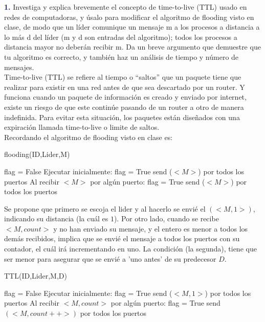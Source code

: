 \newpage
\textbf{\textcolor{MidnightBlue}{1.}}
Investiga y explica brevemente el concepto de time-to-live (TTL) usado en redes de
computadoras, y úsalo para modificar el algoritmo de flooding visto en clase, de modo que un
líder comunique un mensaje m a los procesos a distancia a lo más d del líder (m y d son entradas
del algoritmo); todos los procesos a distancia mayor no deberán recibir m. Da un breve argumento
que demuestre que tu algoritmo es correcto, y también haz un análisis de tiempo y número de
mensajes.\\

Time-to-live (TTL) se refiere al tiempo o “saltos” que un paquete tiene que
realizar para existir en una red antes de que sea descartado por un
router. Y funciona cuando un paquete de información es creado y enviado por internet,
existe un riesgo de que este continúe pasando de un router a otro de manera
indefinida. Para evitar esta situación, los paquetes están diseñados con
una expiración llamada time-to-live o limite de saltos.\\

Recordando el algoritmo de flooding visto en clase es:\\

\begin{algorithm}
\caption{flooding(ID,Lider,M)}\label{alg:cap}
\begin{algorithmic}[1]

\State flag = False
\State Ejecutar inicialmente:
        \State flag = True
        \State send ($<M>$) por todos los puertos
    \EndIf
\State Al recibir $<M>$ por algún puerto:
        \State flag = True
        \State send ($<M>$) por todos los puertos
    \EndIf
\end{algorithmic}
\end{algorithm}

Se propone que primero se escoja el lider y al hacerlo se envié el $(<M,1>)$,
indicando su distancia (la cuál es $1$). Por otro lado, cuando se recibe
$<M,count>$ y no han enviado su mensaje, y el entero es menor a todos los demás
recibidos, implica que se envié el mensaje a todos los  puertos con su contador,
el cuál irá incrementando en uno. La condición (la segunda), tiene que ser menor
para asegurar que se envié a 'uno antes' de su predecesor $D$.\\

\begin{algorithm}
\caption{TTL(ID,Lider,M,D)}\label{alg:cap}
\begin{algorithmic}[1]

\State flag = False
\State Ejecutar inicialmente:
        \State flag = True
        \State send ($<M,1>$) por todos los puertos 
    \EndIf
\State Al recibir $<M,count>$ por algún puerto: 
         \State flag = True
      \State send $(<M,count++>)$ por todos los puertos 
    \EndIf
\end{algorithmic}
\end{algorithm}

